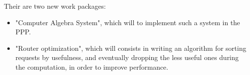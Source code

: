Their are two new work packages:

\begin{itemize}
    \item "Computer Algebra System", which will to implement such a system in the PPP.
    \item "Router optimization", which will consists in writing an algorithm
        for sorting requests by usefulness, and eventually dropping the less
        useful ones during the computation, in order to improve performance.
\end{itemize}

